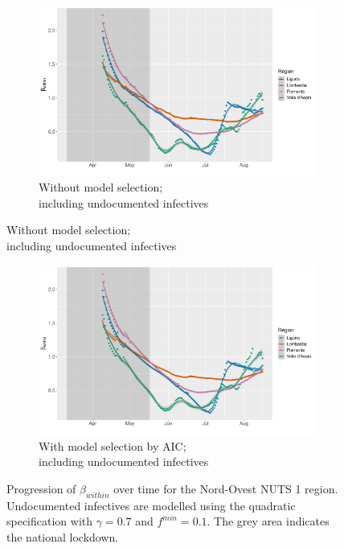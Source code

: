 \documentclass[12pt]{article}
\begin{document}
\begin{appendices}
\begin{figure}[H]
        \end{figure}
        \begin{figure}[H]\ContinuedFloat
    	    \begin{subfigure}{\textwidth}
    	      \centering
    	      \includegraphics[width=0.94\linewidth]{output/model_within_lag14_betawithin_Nord-Ovest_UndocQuadratic_rollingwindow30.pdf}
    	      \caption{Without model selection; \\ including undocumented infectives}
    	      \label{fig:beta_within_over_time_northwest_lowsample_regular_undoc}
    	    \end{subfigure}\newline
        \end{figure}
        \begin{figure}[H]\ContinuedFloat
    	    \begin{subfigure}{\textwidth}
    	      \centering
    	      \includegraphics[width=0.94\linewidth]{output/model_within_lag14_betawithin_Nord-Ovest_aic_UndocQuadratic_rollingwindow30.pdf}
    	      \caption{With model selection by AIC; \\ including undocumented infectives}
    	      \label{fig:beta_within_over_time_northwest_lowsample_aic_undoc}
    	    \end{subfigure}
    	    \caption{Progression of $\beta_{within}$ over time for the Nord-Ovest NUTS 1 region. Undocumented infectives are modelled using the quadratic specification with $\gamma = 0.7$ and $f^{min}=0.1$. The grey area indicates the national lockdown.}
    	    \label{fig:beta_within_over_time_northwest_lowsample}
    	\end{figure}
		

\end{appendices}
\end{document}
